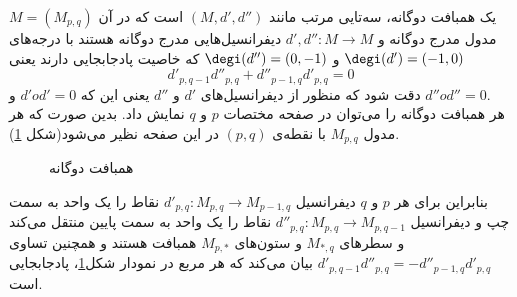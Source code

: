 \begin{definition}
یک
همبافت دوگانه،
سه‌تایی مرتب مانند $(M,d',d'')$ است که در آن
\linebreak
$M=\left(M_{p,q}\right)$
مدول مدرج دوگانه و $d',d'':M\longrightarrow M$ دیفرانسیل‌هایی مدرج دوگانه
هستند با درجه‌های
$\degi(d')=(-1,0)$
و
$\degi(d'')=(0,-1)$
که خاصیت پادجابجایی دارند یعنی
$$d'_{p,{q-1}}d''_{p,q}+d''_{{p-1},q}d'_{p,q}=0$$
دقت شود که منظور از دیفرانسیل‌های $d'$ و $d''$ یعنی این که $d'od'=0$ و $d''od''=0$.\\
هر همبافت دوگانه را می‌توان در صفحه مختصات $p$ و $q$ نمایش داد. بدین صورت که هر مدول $M_{p,q}$ با نقطه‌ی $(p,q)$ در این صفحه نظیر می‌‌شود(شکل \ref{fig:bicomplex}).\\
\begin{figure}
\centering
{}
\caption{همبافت دوگانه}
\label{fig:bicomplex}
\end{figure}
بنابراین برای هر $p$ و $q$
دیفرانسیل‌ $d'_{p,q}:M_{p,q}\longrightarrow M_{{p-1},q}$ نقاط را یک واحد به سمت چپ و دیفرانسیل
$d''_{p,q}:M_{p,q}\longrightarrow M_{p,{q-1}}$
نقاط را یک واحد به سمت پایین منتقل می‌کند و سطرهای $M_{*,q}$ و ستون‌های $M_{p,*}$ همبافت هستند و همچنین تساوی
$d'_{p,{q-1}}d''_{p,q}=-d''_{{p-1},q}d'_{p,q}$
بیان می‌کند که هر مربع در نمودار شکل\ref{fig:bicomplex}، پادجابجایی است.
\end{definition}
